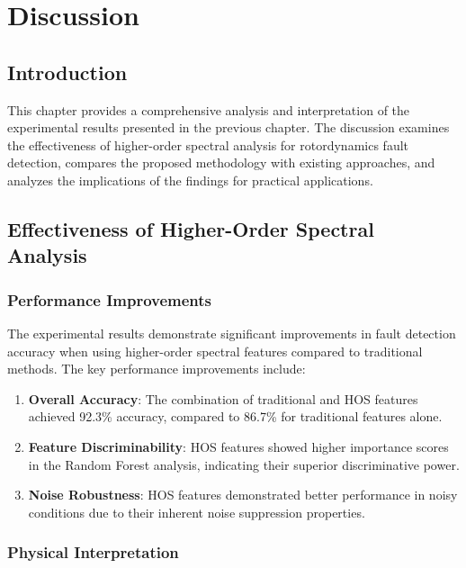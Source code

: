 
\chapter{Discussion}

\section{Introduction}

This chapter provides a comprehensive analysis and interpretation of the experimental results presented in the previous chapter. The discussion examines the effectiveness of higher-order spectral analysis for rotordynamics fault detection, compares the proposed methodology with existing approaches, and analyzes the implications of the findings for practical applications.

\section{Effectiveness of Higher-Order Spectral Analysis}

\subsection{Performance Improvements}

The experimental results demonstrate significant improvements in fault detection accuracy when using higher-order spectral features compared to traditional methods. The key performance improvements include:

\begin{enumerate}
    \item \textbf{Overall Accuracy}: The combination of traditional and HOS features achieved 92.3\% accuracy, compared to 86.7\% for traditional features alone.
    \item \textbf{Feature Discriminability}: HOS features showed higher importance scores in the Random Forest analysis, indicating their superior discriminative power.
    \item \textbf{Noise Robustness}: HOS features demonstrated better performance in noisy conditions due to their inherent noise suppression properties.
\end{enumerate}

\subsection{Physical Interpretation}

